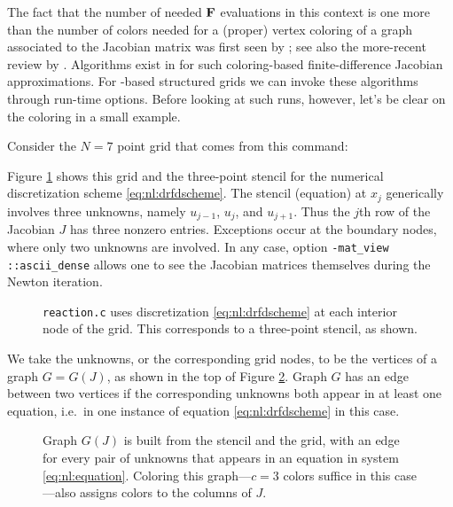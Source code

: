 The fact that the number of needed $\mathbf{F}$ evaluations in this context is one more than the number of colors needed for a (proper) vertex coloring \citep[e.g.~as defined in][]{ChartrandLesniakZhang2011} of a graph associated to the Jacobian matrix was first seen by \citet{ColemanMore1983}; see also the more-recent review by \citet{Gebremedhinetal2005}.  Algorithms exist in \PETSc for such coloring-based finite-difference Jacobian approximations.  For \pDMDA-based structured grids we can invoke these algorithms through run-time options.  Before looking at such runs, however, let's be clear on the coloring in a small example.

Consider the $N=7$ point grid that comes from this command:
Figure \ref{fig:stencilreaction} shows this grid and the three-point stencil for the numerical discretization scheme \eqref{eq:nl:drfdscheme}.  The stencil (equation) at $x_j$ generically involves three unknowns, namely $u_{j-1}$, $u_j$, and $u_{j+1}$.  Thus the $j$th row of the Jacobian $J$ has three nonzero entries.  Exceptions occur at the boundary nodes, where only two unknowns are involved.  In any case, option \texttt{-mat\_view ::ascii\_dense} allows one to see the Jacobian matrices themselves during the Newton iteration.

\begin{figure}

\caption{\texttt{reaction.c} uses discretization \eqref{eq:nl:drfdscheme} at each interior node of the grid.  This corresponds to a three-point stencil, as shown.}
\label{fig:stencilreaction}
\end{figure}

We take the unknowns, or the corresponding grid nodes, to be the vertices of a graph $G=G(J)$, as shown in the top of Figure \ref{fig:fdcolorreaction}.  Graph $G$ has an edge between two vertices if the corresponding unknowns both appear in at least one equation, i.e.~in one instance of equation \eqref{eq:nl:drfdscheme} in this case.

\begin{figure}

\caption{Graph $G(J)$ is built from the stencil and the grid, with an edge for every pair of unknowns that appears in an equation in system \eqref{eq:nl:equation}.  Coloring this graph---$c=3$ colors suffice in this case---also assigns colors to the columns of $J$.}
\label{fig:fdcolorreaction}
\end{figure}

